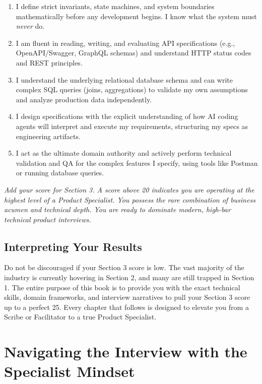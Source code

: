 \begin{enumerate}
\def\labelenumi{\arabic{enumi}.}
\tightlist
\item
  I define strict invariants, state machines, and system boundaries
  mathematically before any development begins. I know what the system
  must \emph{never} do.
\item
  I am fluent in reading, writing, and evaluating API specifications
  (e.g., OpenAPI/Swagger, GraphQL schemas) and understand HTTP status
  codes and REST principles.
\item
  I understand the underlying relational database schema and can write
  complex SQL queries (joins, aggregations) to validate my own
  assumptions and analyze production data independently.
\item
  I design specifications with the explicit understanding of how AI
  coding agents will interpret and execute my requirements, structuring
  my specs as engineering artifacts.
\item
  I act as the ultimate domain authority and actively perform technical
  validation and QA for the complex features I specify, using tools like
  Postman or running database queries.
\end{enumerate}

\emph{Add your score for Section 3. A score above 20 indicates you are
operating at the highest level of a Product Specialist. You possess the
rare combination of business acumen and technical depth. You are ready
to dominate modern, high-bar technical product interviews.}

\subsection{Interpreting Your Results}\label{interpreting-your-results}

Do not be discouraged if your Section 3 score is low. The vast majority
of the industry is currently hovering in Section 2, and many are still
trapped in Section 1. The entire purpose of this book is to provide you
with the exact technical skills, domain frameworks, and interview
narratives to pull your Section 3 score up to a perfect 25. Every
chapter that follows is designed to elevate you from a Scribe or
Facilitator to a true Product Specialist.

\section{Navigating the Interview with the Specialist
Mindset}\label{navigating-the-interview-with-the-specialist-mindset}

